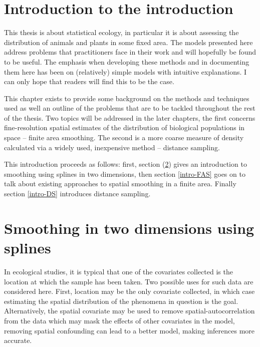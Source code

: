 \label{chap-intro}

\section{Introduction to the introduction}

This thesis is about statistical ecology, in particular it is about assessing the distribution of animals and plants in some fixed area. The models presented here address problems that practitioners face in their work and will hopefully be found to be useful. The emphasis when developing these methods and in documenting them here has been on (relatively) simple models with intuitive explanations. I can only hope that readers will find this to be the case.

This chapter exists to provide some background on the methods and techniques used as well an outline of the problems that are to be tackled throughout the rest of the thesis. Two topics will be addressed in the later chapters, the first concerns fine-resolution spatial estimates of the distribution of biological populations in space -- finite area smoothing. The second is a more coarse measure of density calculated via a widely used, inexpensive method -- distance sampling.

This introduction proceeds as follows: first, section (\ref{intro-GAM}) gives an introduction to smoothing using splines in two dimensions, then section \ref{intro-FAS} goes on to talk about existing approaches to spatial smoothing in a finite area. Finally section \ref{intro-DS} introduces distance sampling.

\section{Smoothing in two dimensions using splines}
\label{intro-GAM}

In ecological studies, it is typical that one of the covariates collected is the location at which the sample has been taken. Two possible uses for such data are considered here. First, location may be the only covariate collected, in which case estimating the spatial distribution of the phenomena in question is the goal. Alternatively, the spatial covariate may be used to remove spatial-autocorrelation from the data which may mask the effects of other covariates in the model, removing spatial confounding can lead to a better model, making inferences more accurate.

